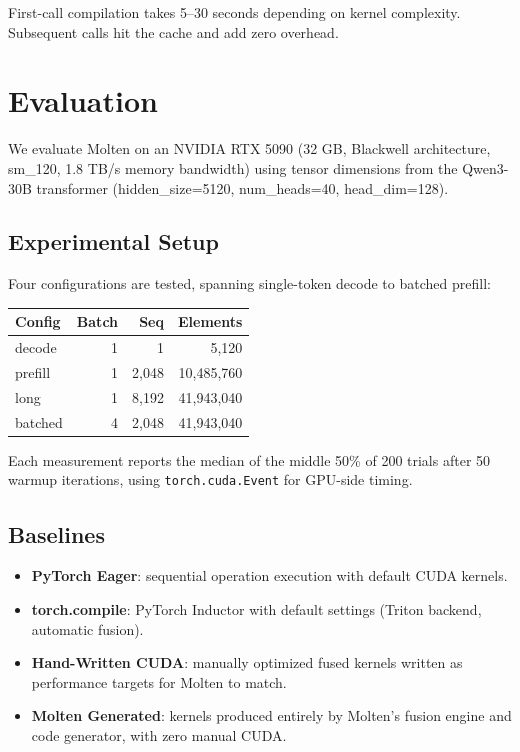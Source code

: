 \documentclass[11pt,a4paper]{article}
\begin{document}
First-call compilation takes 5--30 seconds depending on kernel complexity.
Subsequent calls hit the cache and add zero overhead.

\section{Evaluation}

We evaluate Molten on an NVIDIA RTX 5090 (32 GB, Blackwell architecture,
sm\_120, 1.8 TB/s memory bandwidth) using tensor dimensions from the
Qwen3-30B transformer (hidden\_size=5120, num\_heads=40, head\_dim=128).

\subsection{Experimental Setup}

Four configurations are tested, spanning single-token decode to batched prefill:

\begin{center}
\begin{tabular}{lrrr}
\toprule
Config & Batch & Seq & Elements \\
\midrule
decode & 1 & 1 & 5,120 \\
prefill & 1 & 2,048 & 10,485,760 \\
long & 1 & 8,192 & 41,943,040 \\
batched & 4 & 2,048 & 41,943,040 \\
\bottomrule
\end{tabular}
\end{center}

Each measurement reports the median of the middle 50\% of 200 trials after
50 warmup iterations, using \texttt{torch.cuda.Event} for GPU-side timing.

\subsection{Baselines}

\begin{itemize}
  \item \textbf{PyTorch Eager}: sequential operation execution with default
    CUDA kernels.
  \item \textbf{torch.compile}: PyTorch Inductor with default settings
    (Triton backend, automatic fusion).
  \item \textbf{Hand-Written CUDA}: manually optimized fused kernels written
    as performance targets for Molten to match.
  \item \textbf{Molten Generated}: kernels produced entirely by Molten's
    fusion engine and code generator, with zero manual CUDA.
\end{itemize}
\end{document}

